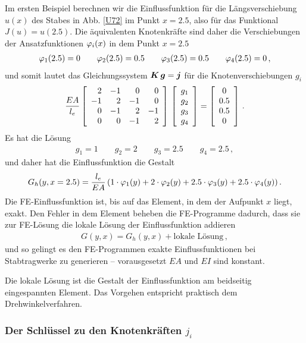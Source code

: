 Im ersten Beispiel berechnen wir die Einflussfunktion f\"{u}r die L\"{a}ngsverschiebung $u(x)$ des Stabes in Abb. \ref{U72} im Punkt $x = 2.5$, also f\"{u}r das Funktional $J(u) = u(2.5)$. Die \"{a}quivalenten Knotenkr\"{a}fte sind daher die Verschiebungen der Ansatzfunktionen $\Np_i(x)$ in dem Punkt $x = 2.5$
\begin{align}\label{Eq110}
\Np_1(2.5) = 0 \qquad \Np_2(2.5) = 0.5 \qquad \Np_3(2.5) = 0.5 \qquad \Np_4(2.5) = 0\,,
\end{align}
und somit lautet das Gleichungssystem $\vek K\,\vek g = \vek j$ f\"{u}r die Knotenverschiebungen $g_i$
\begin{align}\label{Eq68}
\frac{EA}{l_e} \left[\barr{r r r r} 2 & - 1 & 0 & 0 \\ - 1 & 2 & -1 & 0\\ 0 & -1 & 2 &-1 \\ 0 & 0 & -1 &2\earr\right]
\,\left[\barr{c} g_1 \\g_2 \\ g_3 \\ g_4 \earr \right] = \left[\barr{c} 0 \\ 0.5  \\
0.5  \\ 0 \earr \right]\,.
\end{align}
Es hat die L\"{o}sung
\begin{align}
g_1 = 1\qquad g_2 = 2\qquad g_3 = 2.5\qquad g_4 = 2.5\,,
\end{align}
und daher hat die Einflussfunktion die Gestalt
\begin{align}
G_h(y,x = 2.5) = \frac{l_e}{EA}\, (1 \cdot \Np_1(y) + 2 \cdot \Np_2(y) + 2.5 \cdot \Np_3(y) + 2.5 \cdot\Np_4(y))\,.
\end{align}
Die FE-Einflussfunktion ist, bis auf das Element, in dem der Aufpunkt $x$ liegt, exakt.
Den Fehler in dem Element beheben die FE-Programme dadurch, dass sie zur FE-L\"{o}sung die lokale L\"{o}sung der Einflussfunktion addieren
\begin{align}
G(y,x) = G_h(y,x) + \text{lokale L\"{o}sung}\,,
\end{align}
und so gelingt es den FE-Programmen exakte Einflussfunktionen bei Stabtragwerke zu generieren -- vorausgesetzt $EA$ und $EI$ sind konstant.

Die lokale L\"{o}sung ist die Gestalt der Einflussfunktion am beidseitig eingespannten Element. Das Vorgehen entspricht praktisch dem Drehwinkelverfahren.


{\textcolor{sectionTitleBlue}{\subsubsection*{Der Schl\"{u}ssel zu den Knotenkr\"{a}ften $ j_i$}}}

